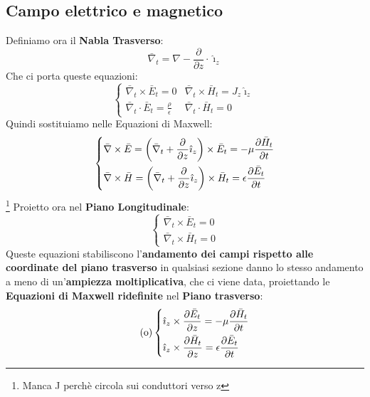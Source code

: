 \subsection{Campo elettrico e magnetico}
Definiamo ora il \textbf{Nabla Trasverso}:
\begin{equation*}
    \bar{\nabla}_t = \nabla - \frac{\partial}{\partial z} \cdot \hat{\imath}_z
\end{equation*}
Che ci porta queste equazioni:
\begin{equation*}
    \begin{cases}
        \bar{\nabla}_t \times \bar{E}_t = 0 & \bar{\nabla}_t \times \bar{H}_t = J_z \hat{\imath}_z\\
        \bar{\nabla}_t \cdot \bar{E}_t = \frac{\rho}{\epsilon} & \bar{\nabla}_t \cdot \bar{H}_t = 0
    \end{cases}
\end{equation*}
Quindi sostituiamo nelle Equazioni di Maxwell:
\begin{equation*}
\begin{dcases}
    \bar{\nabla} \times \bar{E} = \left(\bar{\nabla}_t + \frac{\partial}{\partial z} \hat{\imath}_z\right) \times \bar{E}_t = - \mu \frac{\partial \bar{H}_t}{\partial t}\\
    \bar{\nabla} \times \bar{H} = \left(\bar{\nabla}_t + \frac{\partial}{\partial z} \hat{\imath}_z\right) \times \bar{H}_t = \epsilon \frac{\partial \bar{E}_t}{\partial t}
\end{dcases}
\end{equation*}
\footnote{Manca J perchè circola sui conduttori verso z}
Proietto ora nel \textbf{Piano Longitudinale}:
\begin{equation*}
\tag{*}
    \begin{cases}
        \bar{\nabla}_t \times \bar{E}_t = 0\\
        \bar{\nabla}_t \times \bar{H}_t = 0
    \end{cases}
\end{equation*}
Queste equazioni stabiliscono l'\textbf{andamento dei campi rispetto alle coordinate del piano trasverso} in qualsiasi sezione danno lo stesso andamento a meno di un'\textbf{ampiezza moltiplicativa}, che ci viene data, proiettando le \textbf{Equazioni di Maxwell ridefinite} nel \textbf{Piano trasverso}:
\begin{equation*}
\tag{o}
    \begin{dcases}
    \hat{\imath}_z \times \frac{\partial \bar{E}_t}{\partial z} =  - \mu \frac{\partial \bar{H}_t}{\partial t}\\
    \hat{\imath}_z \times \frac{\partial \bar{H}_t}{\partial z} =  \epsilon \frac{\partial \bar{E}_t}{\partial t}
    \end{dcases}
\end{equation*}
